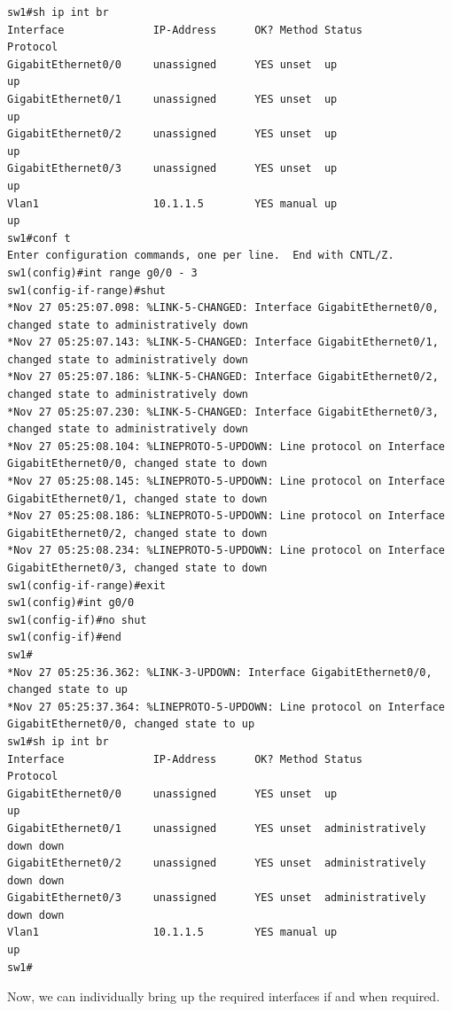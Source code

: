 \vspace{-15pt}
\begin{verbatim}
sw1#sh ip int br
Interface              IP-Address      OK? Method Status                Protocol
GigabitEthernet0/0     unassigned      YES unset  up                    up
GigabitEthernet0/1     unassigned      YES unset  up                    up
GigabitEthernet0/2     unassigned      YES unset  up                    up
GigabitEthernet0/3     unassigned      YES unset  up                    up
Vlan1                  10.1.1.5        YES manual up                    up
sw1#conf t
Enter configuration commands, one per line.  End with CNTL/Z.
sw1(config)#int range g0/0 - 3
sw1(config-if-range)#shut
*Nov 27 05:25:07.098: %LINK-5-CHANGED: Interface GigabitEthernet0/0, changed state to administratively down
*Nov 27 05:25:07.143: %LINK-5-CHANGED: Interface GigabitEthernet0/1, changed state to administratively down
*Nov 27 05:25:07.186: %LINK-5-CHANGED: Interface GigabitEthernet0/2, changed state to administratively down
*Nov 27 05:25:07.230: %LINK-5-CHANGED: Interface GigabitEthernet0/3, changed state to administratively down
*Nov 27 05:25:08.104: %LINEPROTO-5-UPDOWN: Line protocol on Interface GigabitEthernet0/0, changed state to down
*Nov 27 05:25:08.145: %LINEPROTO-5-UPDOWN: Line protocol on Interface GigabitEthernet0/1, changed state to down
*Nov 27 05:25:08.186: %LINEPROTO-5-UPDOWN: Line protocol on Interface GigabitEthernet0/2, changed state to down
*Nov 27 05:25:08.234: %LINEPROTO-5-UPDOWN: Line protocol on Interface GigabitEthernet0/3, changed state to down
sw1(config-if-range)#exit
sw1(config)#int g0/0
sw1(config-if)#no shut
sw1(config-if)#end
sw1#
*Nov 27 05:25:36.362: %LINK-3-UPDOWN: Interface GigabitEthernet0/0, changed state to up
*Nov 27 05:25:37.364: %LINEPROTO-5-UPDOWN: Line protocol on Interface GigabitEthernet0/0, changed state to up
sw1#sh ip int br
Interface              IP-Address      OK? Method Status                Protocol
GigabitEthernet0/0     unassigned      YES unset  up                    up
GigabitEthernet0/1     unassigned      YES unset  administratively down down
GigabitEthernet0/2     unassigned      YES unset  administratively down down
GigabitEthernet0/3     unassigned      YES unset  administratively down down
Vlan1                  10.1.1.5        YES manual up                    up
sw1#
\end{verbatim}
\vspace{-10pt}

\noindent
Now, we can individually bring up the required interfaces if and when required. 

